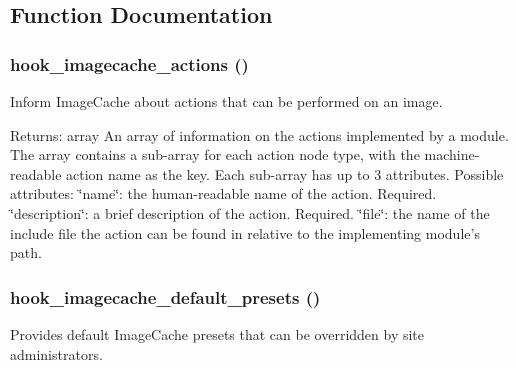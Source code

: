 \subsection{Function Documentation}
\hypertarget{group__hooks_gfea2ca26f6178230dca0a71ae21bef8b}{
\subsubsection[{hook\_\-imagecache\_\-actions}]{\setlength{\rightskip}{0pt plus 5cm}hook\_\-imagecache\_\-actions ()}}
\label{group__hooks_gfea2ca26f6178230dca0a71ae21bef8b}


Inform ImageCache about actions that can be performed on an image.

\begin{Desc}
\item[Returns:]array An array of information on the actions implemented by a module. The array contains a sub-array for each action node type, with the machine-readable action name as the key. Each sub-array has up to 3 attributes. Possible attributes: \char`\"{}name\char`\"{}: the human-readable name of the action. Required. \char`\"{}description\char`\"{}: a brief description of the action. Required. \char`\"{}file\char`\"{}: the name of the include file the action can be found in relative to the implementing module's path. \end{Desc}
\hypertarget{group__hooks_gd1b2ea040501521cfab6683c33517998}{
\subsubsection[{hook\_\-imagecache\_\-default\_\-presets}]{\setlength{\rightskip}{0pt plus 5cm}hook\_\-imagecache\_\-default\_\-presets ()}}
\label{group__hooks_gd1b2ea040501521cfab6683c33517998}


Provides default ImageCache presets that can be overridden by site administrators.

